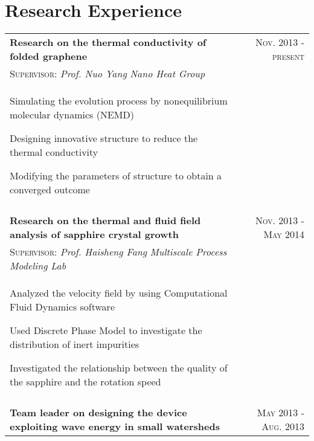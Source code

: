 \documentclass[a4paper,10pt]{article}
\begin{document}
\section{Research Experience}
\begin{tabular}{p{14cm}r}
\textbf{Research on the thermal conductivity of folded graphene}  &\textsc{Nov. 2013 - present} \\
\hspace{1em}\textsc{Supervisor:} \emph{Prof. Nuo Yang \hspace{19em}} \emph{Nano Heat Group} & \vspace{-0.5em}\\
\begin{compactitem}
       \item Simulating the evolution process by nonequilibrium molecular dynamics (NEMD)
       \item Designing innovative structure to reduce the thermal conductivity
       \item Modifying the parameters of structure to obtain a converged outcome
     \end{compactitem}&\vspace{-1em} \\
\multicolumn{2}{c}{} \\
\textbf{Research on the thermal and fluid field analysis of sapphire crystal growth}  &\textsc{Nov. 2013 - May 2014} \\
\hspace{1em} \textsc{Supervisor:} \emph{Prof. Haisheng Fang} \hspace{10em} \emph{Multiscale Process Modeling Lab}  & \vspace{-0.5em} \\
\begin{compactitem}
       \item Analyzed the velocity field by using Computational Fluid Dynamics software
       \item Used Discrete Phase Model to investigate the distribution of inert impurities
       \item Investigated the relationship between the quality of the sapphire and the rotation speed
     \end{compactitem}&\vspace{-1em} \\
\multicolumn{2}{c}{} \\
 \textbf{Team leader on designing the device exploiting wave energy in small watersheds}  &\textsc{May 2013 - Aug. 2013} \\

\end{tabular}
\end{document}
